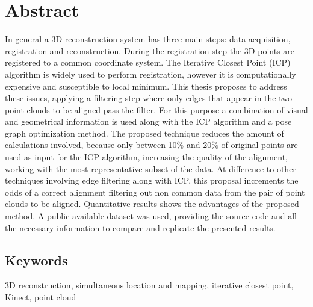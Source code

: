 
\chapter*{Abstract}

In general a 3D reconstruction system has three main steps: data acquisition, registration and reconstruction. During the registration step the 3D points are registered to a common coordinate system. The Iterative Closest Point (ICP) algorithm is widely used to perform registration, however it 
is computationally expensive and susceptible to local minimum. This thesis proposes to address these issues, 
applying a filtering step where only edges that appear 
in the two point clouds to be aligned pass the filter. For this purpose a combination of visual and geometrical information is 
used along with the ICP
  algorithm and a pose graph optimization method. The proposed technique reduces the amount of calculations 
involved, because only between 10\% and 20\% of original points are used as input for the ICP algorithm, increasing 
the quality of the alignment, working with the most representative subset of the data. At difference to other techniques 
involving edge filtering along with ICP, this proposal increments the odds of a correct alignment filtering out non common 
data from the pair of point clouds to be aligned. Quantitative results shows the advantages of the proposed method. A 
public available dataset was used, 
providing the source 
code and all the necessary information to compare and replicate the presented results.

\section*{Keywords}

3D reconstruction, simultaneous location and mapping, iterative closest point, Kinect, point cloud

